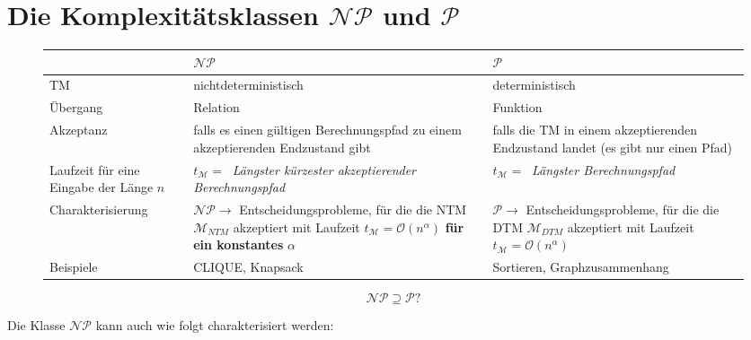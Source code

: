 \documentclass{scrartcl}%
\begin{document}

    \section*{Die Komplexitätsklassen $\mathcal{N}\mathcal{P}$ und $\mathcal{P}$}

    \begin{figure}[H]
        \centering
        \begin{table}[H]
            \centering
            \renewcommand{\arraystretch}{1.7}
            \setlength{\tabcolsep}{4mm}
            \begin{tabular}{R{3cm}|p{4cm}|p{4cm}}
                & $\mathcal{N}\mathcal{P}$ & $\mathcal{P}$ \\\hline
                TM & nichtdeterministisch & deterministisch \\
                Übergang & Relation & Funktion \\
                Akzeptanz & falls es einen gültigen Berechnungspfad zu einem akzeptierenden Endzustand gibt & falls die TM in einem akzeptierenden Endzustand landet (es gibt nur einen Pfad) \\
                Laufzeit für eine Eingabe der Länge $n$& $t_{\mathcal{M}} =\ $ \textit{Längster kürzester akzeptierender Berechnungspfad} & $t_{\mathcal{M}} =\ $ \textit{Längster Berechnungspfad} \\
                Charakterisierung
                & $\mathcal{N}\mathcal{P} \rightarrow$ Entscheidungsprobleme, für die die NTM $\mathcal{M}_{NTM}$ akzeptiert mit Laufzeit $t_{\mathcal{M}} =\mathcal{O}(n^\alpha)$ \textbf{\textsf{für ein konstantes}} $\alpha$
                & $\mathcal{P} \rightarrow$ Entscheidungsprobleme, für die die DTM $\mathcal{M}_{DTM}$ akzeptiert mit Laufzeit $t_{\mathcal{M}} =\mathcal{O}(n^\alpha)$ \\
                Beispiele & CLIQUE, Knapsack & Sortieren, Graphzusammenhang \\
            \end{tabular}
        \end{table}
    \end{figure}

    \begin{equation*}
        \mathcal{N}\mathcal{P} \supseteq \mathcal{P} ?
    \end{equation*}

    Die Klasse $\mathcal{N}\mathcal{P}$ kann auch wie folgt charakterisiert werden:
\end{document}
